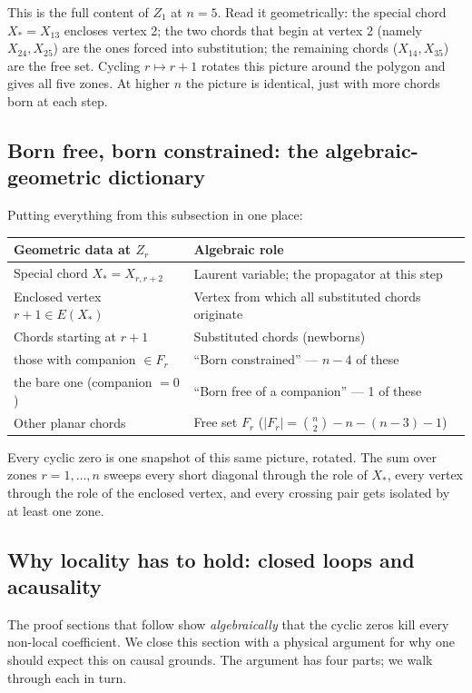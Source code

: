 \documentclass[11pt]{article}
\theoremstyle{definition}
\begin{document}
\medskip
\noindent
This is the full content of $Z_1$ at $n=5$. Read it geometrically: the special chord $X_*=X_{13}$ encloses vertex 2; the two chords that begin at vertex 2 (namely $X_{24}, X_{25}$) are the ones forced into substitution; the remaining chords ($X_{14}, X_{35}$) are the free set. Cycling $r \mapsto r+1$ rotates this picture around the polygon and gives all five zones. At higher $n$ the picture is identical, just with more chords born at each step.

\subsection*{Born free, born constrained: the algebraic-geometric dictionary}

Putting everything from this subsection in one place:

\begin{center}
\begin{tabular}{l|l}
\textbf{Geometric data at $Z_r$} & \textbf{Algebraic role} \\\hline
Special chord $X_*=X_{r,r+2}$ & Laurent variable; the propagator at this step \\
Enclosed vertex $r+1 \in E(X_*)$ & Vertex from which all substituted chords originate \\
Chords starting at $r+1$ & Substituted chords (newborns) \\
\quad those with companion $\in F_r$ & ``Born constrained'' --- $n-4$ of these \\
\quad the bare one (companion $=0$) & ``Born free of a companion'' --- 1 of these \\
Other planar chords & Free set $F_r$ ($\big|F_r\big| = \binom{n}{2}-n-(n-3)-1$)
\end{tabular}
\end{center}

\noindent
Every cyclic zero is one snapshot of this same picture, rotated. The sum over zones $r=1,\dots,n$ sweeps every short diagonal through the role of $X_*$, every vertex through the role of the enclosed vertex, and every crossing pair gets isolated by at least one zone.

\subsection{Why locality has to hold: closed loops and acausality} \label{sec:closedloop}

The proof sections that follow show \emph{algebraically} that the cyclic zeros kill every non-local coefficient. We close this section with a physical argument for why one should expect this on causal grounds. The argument has four parts; we walk through each in turn.
\end{document}
